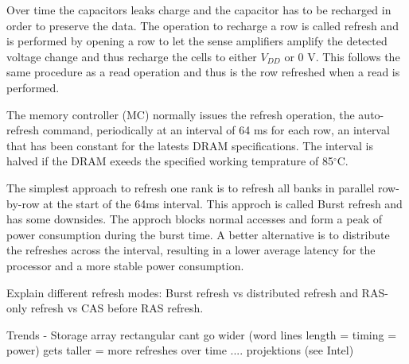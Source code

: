 Over time the capacitors leaks charge and the capacitor has to be recharged in order to preserve the data. The operation to recharge a row is called refresh and is performed by opening a row to let the sense amplifiers amplify the detected voltage change and thus recharge the cells to either \(V_{DD}\) or 0 V. This follows the same procedure as a read operation and thus is the row refreshed when a read is performed. 

The memory controller (MC) normally issues the refresh operation, the auto-refresh command, periodically at an interval of 64 ms for each row, an interval that has been constant for the latests DRAM specifications. The interval is halved if the DRAM exeeds the specified working temprature of 85$^{\circ}$C. 

The simplest approach to refresh one rank is to refresh all banks in parallel row-by-row at the start of the 64ms interval. This approch is called Burst refresh and has some downsides. The approch blocks normal accesses and form a peak of power consumption during the burst time. A better alternative is to distribute the refreshes across the interval, resulting in a lower average latency for the processor and a more stable power consumption.


Explain different refresh modes: Burst refresh vs distributed refresh and RAS-only refresh vs CAS before RAS refresh.

Trends - Storage array rectangular
            cant go wider (word lines length = timing = power)
            gets taller = more refreshes
            over time .... projektions (see Intel)
